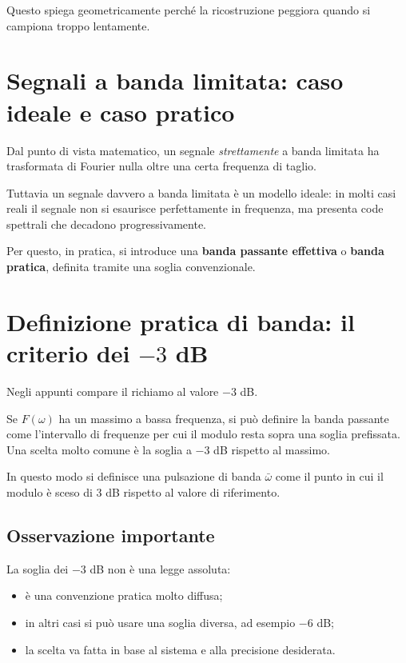 Questo spiega geometricamente perché la ricostruzione peggiora quando si campiona troppo lentamente.

\section{Segnali a banda limitata: caso ideale e caso pratico}

Dal punto di vista matematico, un segnale \emph{strettamente} a banda limitata
ha trasformata di Fourier nulla oltre una certa frequenza di taglio.

Tuttavia un segnale davvero a banda limitata è un modello ideale:
in molti casi reali il segnale non si esaurisce perfettamente in frequenza,
ma presenta code spettrali che decadono progressivamente.

Per questo, in pratica, si introduce una \textbf{banda passante effettiva}
o \textbf{banda pratica}, definita tramite una soglia convenzionale.

\section{Definizione pratica di banda: il criterio dei \(-3\) dB}

Negli appunti compare il richiamo al valore \(-3\) dB.

Se \(F(\omega)\) ha un massimo a bassa frequenza, si può definire la banda passante
come l'intervallo di frequenze per cui il modulo resta sopra una soglia prefissata.
Una scelta molto comune è la soglia a \(-3\) dB rispetto al massimo.

In questo modo si definisce una pulsazione di banda \(\bar\omega\) come il punto
in cui il modulo è sceso di \(3\) dB rispetto al valore di riferimento.

\subsection{Osservazione importante}

La soglia dei \(-3\) dB non è una legge assoluta:
\begin{itemize}
    \item è una convenzione pratica molto diffusa;
    \item in altri casi si può usare una soglia diversa, ad esempio \(-6\) dB;
    \item la scelta va fatta in base al sistema e alla precisione desiderata.
\end{itemize}

